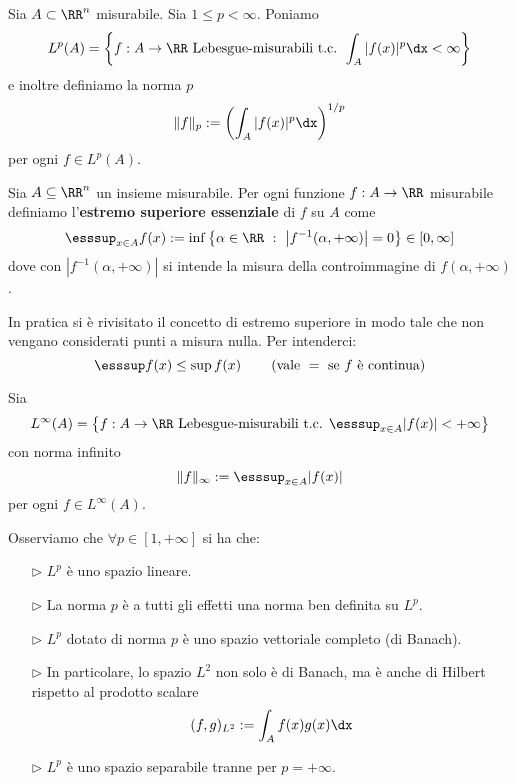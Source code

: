 \begin{defn}
Sia $A\subset \RR^{n}$ misurabile. Sia $1 \leq p < \infty $. Poniamo
\begin{equation*}
L^{p}(A) = \left\{f: A\rightarrow \RR\text{ Lebesgue-misurabili t.c. }\int_{A}| f(x)|^{p} \dx < \infty \right\}
\end{equation*}
e inoltre definiamo la norma $p$
$$
\Vert f \Vert_p:= \left(\int_{A}|f(x)|^{p} \dx\right)^{1/p}
$$
per ogni $f\in L^p(A)$.
\end{defn}
\begin{defn}
Sia $A\subseteq\RR^n$ un insieme misurabile. Per ogni funzione $f:A\to\RR$ misurabile definiamo l'\textbf{estremo superiore essenziale} di $f$ su $A$ come
$$
\esssup_{x\in A} f(x):=\inf\left\{ \alpha\in\RR\ :\ \left|f^{-1}(\alpha,+\infty) \right|=0 \right\}\in[0,\infty]
$$
dove con $\left|f^{-1}(\alpha,+\infty) \right|$ si intende la misura della controimmagine di $f(\alpha,+\infty)$.
\end{defn}
In pratica si è rivisitato il concetto di estremo superiore in modo tale che non vengano considerati punti a misura nulla. Per intenderci:
\begin{equation*}
\esssup f(x)\leq \sup f(x)\qquad \left(\text{vale } =\text{ se }f\text{ è continua}\right)
\end{equation*}

\begin{defn}
Sia
\begin{equation*}
L^{\infty}(A) = \left\{f: A\rightarrow \RR\text{ Lebesgue-misurabili t.c. }\esssup_{x\in A} |f(x)|<+ \infty \right\}
\end{equation*}
con norma infinito
\begin{equation*}
\Vert f \Vert_{\infty} := \esssup_{x\in A} |f(x)|
\end{equation*}
per ogni $f\in L^\infty(A)$.
\end{defn}

Osserviamo che $\forall p\in[1,+\infty]$ si ha che:
\begin{enumerate}
    \item [$\triangleright$] $L^p$ è uno spazio lineare.

    \item [$\triangleright$] La norma $p$ è a tutti gli effetti una norma ben definita su $L^p$.

    \item [$\triangleright$] $L^p$ dotato di norma $p$ è uno spazio vettoriale completo (di Banach).

    \item [$\triangleright$] In particolare, lo spazio $L^2$ non solo è di Banach, ma è anche di Hilbert rispetto al prodotto scalare
    $$
    (f,g)_{L^2}:=\int_A f(x) g(x)\dx
    $$

    \item [$\triangleright$] $L^p$ è uno spazio separabile tranne per $p=+\infty$.
\end{enumerate}

